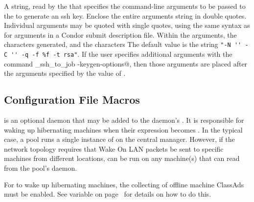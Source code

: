 \begin{description}
\label{param:SSHToJobSSHKeygenArgs}
\item[\Macro{SSH\_TO\_JOB\_SSH\_KEYGEN\_ARGS}]
  A string, read by the  that specifies 
  the command-line arguments to be passed to the 
  to generate an ssh key.
  Enclose the entire arguments string in double quotes.
  Individual arguments may be quoted with single quotes, using the same
  syntax as for arguments in a Condor submit description file.
  Within the arguments, 
  the characters \verb@%f@ are replaced by the path to the key file to be
  generated,
  and the characters \verb@%%@ are replaced by a single percent character.
  The default value is the string
  \verb|"-N '' -C '' -q -f %f -t rsa"|.
  If the user specifies additional
  arguments with the command
  \verb@condor_ssh_to_job -keygen-options@,
  then those arguments are placed after the arguments specified by
  the value of .

\end{description}

\subsection{\label{sec:Config-rooster} Configuration File Macros}

 is an optional daemon that may be added to the
 daemon's .
It is responsible for waking up
hibernating machines when their  expression becomes
.
In the typical case, a pool runs a single instance of
 on the central manager.
However, if the network topology requires that 
Wake On LAN packets be sent to specific machines from different locations,
 can be run on any
machine(s) that can read from the pool's  daemon.

For  to wake up hibernating machines, the collecting
of offline machine ClassAds must be enabled.  See variable
 on page~\pageref{param:OfflineLog} for details on
how to do this.

